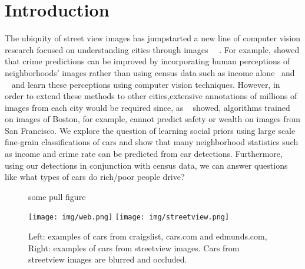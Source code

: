 \documentclass[10pt,twocolumn,letterpaper]{article}
\begin{document}
\section{Introduction}
The ubiquity of street view images has jumpstarted a new line of computer vision research focused on understanding cities through images \cite{mit_plos_1}~\cite{MIT_vision}~\cite{tamara}. For example, \cite{mit_plos_1} showed that crime predictions can be improved by incorporating human perceptions of neighborhoods' images rather than using census data such as income alone~\cite{mit_plos_1} and ~\cite{tamara} and \cite{MIT_vision} learn these perceptions using computer vision techniques. However, in order to extend these methods to other cities,extensive annotations of millions of images from each city would be required since, as ~\cite{tamara} showed, algorithms trained on images of Boston, for example, cannot predict safety or wealth on images from San Francisco.  We explore the question of learning social priors using large scale fine-grain classifications of cars and show that many neighborhood statistics such as income and crime rate can be predicted from car detections. Furthermore, using our detections in conjunction with census data, we can answer questions like what types of cars do rich/poor people drive? 

\begin{figure}[t]
\begin{center}
\fbox{\rule{0pt}{2in} \rule{0.9\linewidth}{0pt}}
\end{center}
   \caption{some pull figure}
\label{fig:pull}
\end{figure}

\label{fig:dataset1}
\begin{figure}[t]
\begin{center}
   \texttt{[image: img/web.png]}
   \texttt{[image: img/streetview.png]}
\end{center}
   \caption{Left: examples of cars from craigslist, cars.com and edmunds.com, Right: examples of cars from streetview images. Cars from streetview images are blurred and occluded.}
\end{figure}
\end{document}
